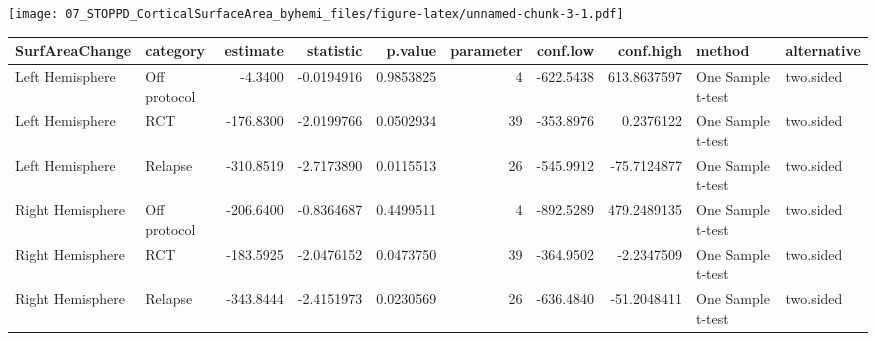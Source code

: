 \documentclass[]{article}
\newenvironment{Shaded}{\begin{snugshade}}{\end{snugshade}}
\newcommand{\KeywordTok}[1]{\textcolor[rgb]{0.13,0.29,0.53}{\textbf{#1}}}
\newcommand{\DataTypeTok}[1]{\textcolor[rgb]{0.13,0.29,0.53}{#1}}
\newcommand{\DecValTok}[1]{\textcolor[rgb]{0.00,0.00,0.81}{#1}}
\newcommand{\StringTok}[1]{\textcolor[rgb]{0.31,0.60,0.02}{#1}}
\newcommand{\OperatorTok}[1]{\textcolor[rgb]{0.81,0.36,0.00}{\textbf{#1}}}
\newcommand{\NormalTok}[1]{#1}
\theoremstyle{definition}
\theoremstyle{definition}
\theoremstyle{definition}
\theoremstyle{remark}
\begin{document}
\texttt{[image: 07\_STOPPD\_CorticalSurfaceArea\_byhemi\_files/figure-latex/unnamed-chunk-3-1.pdf]}

\begin{Shaded}
\end{Shaded}

\begin{tabular}{l|l|r|r|r|r|r|r|l|l}
\hline
SurfAreaChange & category & estimate & statistic & p.value & parameter & conf.low & conf.high & method & alternative\\
\hline
Left Hemisphere & Off protocol & -4.3400 & -0.0194916 & 0.9853825 & 4 & -622.5438 & 613.8637597 & One Sample t-test & two.sided\\
\hline
Left Hemisphere & RCT & -176.8300 & -2.0199766 & 0.0502934 & 39 & -353.8976 & 0.2376122 & One Sample t-test & two.sided\\
\hline
Left Hemisphere & Relapse & -310.8519 & -2.7173890 & 0.0115513 & 26 & -545.9912 & -75.7124877 & One Sample t-test & two.sided\\
\hline
Right Hemisphere & Off protocol & -206.6400 & -0.8364687 & 0.4499511 & 4 & -892.5289 & 479.2489135 & One Sample t-test & two.sided\\
\hline
Right Hemisphere & RCT & -183.5925 & -2.0476152 & 0.0473750 & 39 & -364.9502 & -2.2347509 & One Sample t-test & two.sided\\
\hline
Right Hemisphere & Relapse & -343.8444 & -2.4151973 & 0.0230569 & 26 & -636.4840 & -51.2048411 & One Sample t-test & two.sided\\
\hline
\end{tabular}
\end{document}
